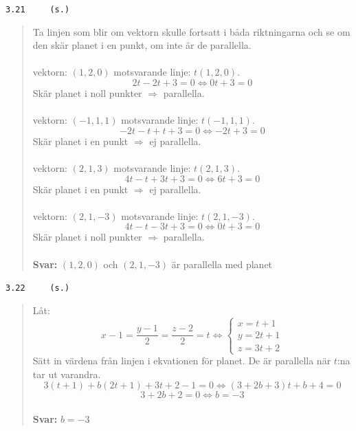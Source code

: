 \documentclass[a4paper]{article}
\newcommand{\tskcol}[1]{\textcolor{tskcol}{#1}}
\begin{document}
\pagebreak
\texttt{\tskcol{3.21~~~~ (s.)}}
\begin{quotation}
	\noindent
	Ta linjen som blir om vektorn skulle fortsatt i båda riktningarna och se om den skär planet i en punkt, om inte är de parallella.
	\\ \\
	vektorn: $(1,2,0)$ motsvarande linje: $t(1,2,0)$.
	\[2t-2t+3=0 \Leftrightarrow
	0t+3=0\]
	Skär planet i noll punkter $\Rightarrow$ parallella.
	\\ \\
	vektorn: $(-1,1,1)$ motsvarande linje: $t(-1,1,1)$.
	\[-2t-t+t+3=0 \Leftrightarrow
	-2t+3=0\]
	Skär planet i en punkt $\Rightarrow$ ej parallella.
	\\ \\
	vektorn: $(2,1,3)$ motsvarande linje: $t(2,1,3)$.
	\[4t-t+3t+3=0 \Leftrightarrow
	6t+3=0\]
	Skär planet i en punkt $\Rightarrow$ ej parallella.
	\\ \\
	vektorn: $(2,1,-3)$ motsvarande linje: $t(2,1,-3)$.
	\[4t-t-3t+3=0 \Leftrightarrow
	0t+3=0\]
	Skär planet i noll punkter $\Rightarrow$ parallella.
	\\ \\
	\textbf{Svar:} $(1,2,0)$ och $(2,1,-3)$ är parallella med planet
\end{quotation}

\texttt{\tskcol{3.22~~~~ (s.)}}
\begin{quotation}
	\noindent
	Låt:
	\[x-1=\frac{y-1}{2}=\frac{z-2}{2}=t \Leftrightarrow
	\begin{cases}
	x=t+1 \\
	y=2t+1 \\
	z=3t+2
	\end{cases}\]
	Sätt in värdena från linjen i ekvationen för planet. De är parallella när $t$:na tar ut varandra.
	\[3(t+1)+b(2t+1)+3t+2-1=0 \Leftrightarrow
	(3+2b+3)t+b+4=0\]
	\[3+2b+2=0 \Leftrightarrow
	b=-3\]
	\\
	\textbf{Svar:} $b=-3$
\end{quotation}
\end{document}
